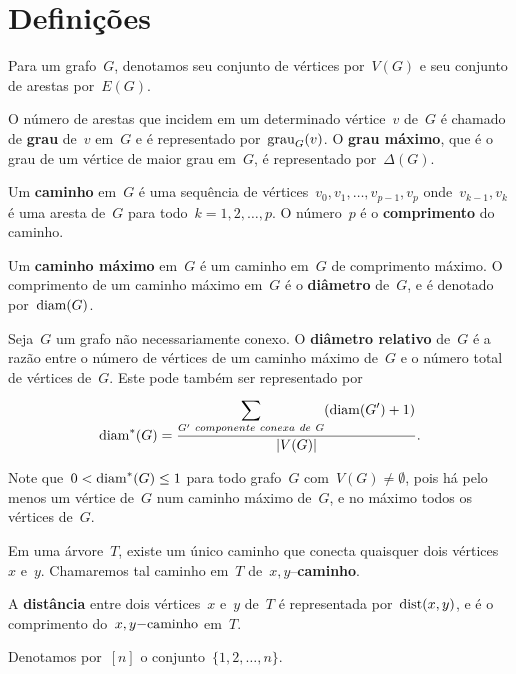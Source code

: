 \section{Definições}
	
	Para um grafo~$G$, denotamos seu
	conjunto de vértices por~$V(G)$ e seu
	conjunto de arestas por~$E(G)$.

\bigskip
	O número de arestas que incidem em um 
	determinado vértice~$v$ de~$G$ é chamado de 
	\textbf{grau} de~$v$ em~$G$ e é representado
	por~$\mathrm{grau}_G(v)$. O 
	\textbf{grau máximo}, que é o grau de um vértice de
	maior grau em~$G$, é representado por~$\Delta(G)$.

\bigskip

	Um \textbf{caminho} em~$G$ é uma sequência de 
	vértices~$v_0, v_1, \ldots,v_{p-1}, v_p$ 
	onde~$v_{k-1}, v_k$ é uma aresta de~$G$ para 
	todo~${k =1,2, \ldots, p}$. 
	O número~$p$ é o \textbf{comprimento} do caminho.

\bigskip

	Um \textbf{caminho máximo} em~$G$ é um caminho 
	em~$G$ de comprimento máximo.
	O comprimento de um caminho máximo em~$G$
	é o \textbf{diâmetro} de~$G$, e é denotado por~$\mathrm{diam}(G)$.



	Seja~$G$ um grafo não necessariamente conexo.
	O \textbf{diâmetro relativo} de~$G$
	 é a razão entre o número
	de vértices de um caminho máximo de~$G$ e o número total de vértices
	de~$G$. Este pode também ser representado por
	$$ \mathrm{diam}^*(G) =\dfrac{\displaystyle\sum_{
	G'~componente~conexa~de~G}^{}(\mathrm{diam}(G')+1)}{|V(G)|}.$$

	Note que~${0<\mathrm{diam}^*(G)\le 1}$ para todo grafo~$G$ 
	com~${V(G)\ne \emptyset}$, pois há pelo menos um vértice 
	de~$G$ num caminho máximo de~$G$, e no máximo 
	todos os vértices de~$G$.

\bigskip

	Em uma árvore~$T$, existe um único caminho que conecta 
	quaisquer dois vértices~$x$ e~$y$. 
	Chamaremos tal caminho em~$T$ de~$x,y$--\textbf{caminho}.

\bigskip

	A \textbf{distância} entre dois vértices~$x$ e~$y$ de~$T$ é 
	representada por~$\mathrm{dist}(x,y)$, e é o comprimento 
	do~$x,y\mathrm{-caminho}$ em~$T$.

\bigskip

	Denotamos por~$[n]$
	o conjunto~$\{1,2,\ldots,n\}$.


\bigskip
\bigskip
\bigskip
